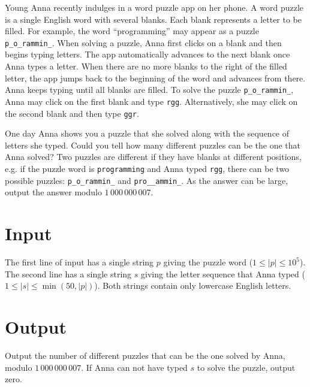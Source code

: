 
Young Anna recently indulges in a word puzzle app on her phone.
A word puzzle is a single English word with several blanks.
Each blank represents a letter to be filled.
For example, the word ``programming'' may appear as a puzzle {\tt p\_o\_rammin\_}.
When solving a puzzle, Anna first clicks on a blank and then begins typing letters.
The app automatically advances to the next blank once Anna types a letter.
When there are no more blanks to the right of the filled letter, the app jumps back to the beginning of the word and advances from there.
Anna keeps typing until all blanks are filled.
To solve the puzzle {\tt p\_o\_rammin\_}, Anna may click on the first blank and type {\tt rgg}.
Alternatively, she may click on the second blank and then type {\tt ggr}.

One day Anna shows you a puzzle that she solved along with the sequence of letters she typed.
Could you tell how many different puzzles can be the one that Anna solved?
Two puzzles are different if they have blanks at different positions,
e.g. if the puzzle word is {\tt programming} and Anna typed {\tt rgg}, there can be two possible puzzles: {\tt p\_o\_rammin\_} and {\tt pro\_\_ammin\_}.
As the answer can be large, output the answer modulo $1\,000\,000\,007$.

\section*{Input}
The first line of input has a single string $p$ giving the puzzle word ($1 \leq |p| \leq 10^5$).
The second line has a single string $s$ giving the letter sequence that Anna typed ($1 \leq |s| \leq \min(50, |p|)$).
Both strings contain only lowercase English letters.

\section*{Output}
Output the number of different puzzles that can be the one solved by Anna, modulo $1\,000\,000\,007$.
If Anna can not have typed $s$ to solve the puzzle, output zero.
